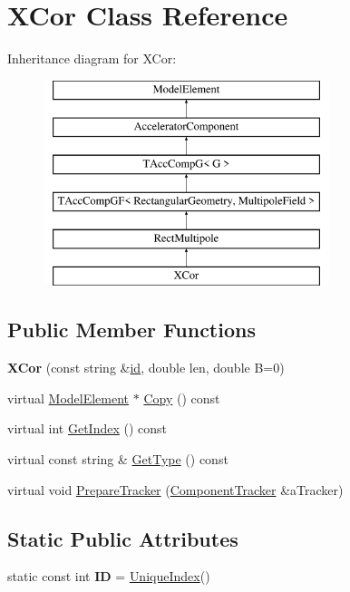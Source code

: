 \hypertarget{classXCor}{}\section{X\+Cor Class Reference}
\label{classXCor}
Inheritance diagram for X\+Cor\+:\begin{figure}[H]
\begin{center}
\leavevmode
\includegraphics[height=6.000000cm]{classXCor}
\end{center}
\end{figure}
\subsection*{Public Member Functions}
\begin{DoxyCompactItemize}
\item 
\mbox{\label{classXCor_a78a89fe33ceb8435e2810973e8e9acc3}} 
{\bfseries X\+Cor} (const string \&\hyperlink{classModelElement_aada171ead2085c75b592cf07d91bc5c2}{id}, double len, double B=0)
\item 
virtual \hyperlink{classModelElement}{Model\+Element} $\ast$ \hyperlink{classXCor_a8c84be893f565bd2dac6cf24da38873f}{Copy} () const
\item 
virtual int \hyperlink{classXCor_abc1f1ab53804904384d6fadfcbaba5bb}{Get\+Index} () const
\item 
virtual const string \& \hyperlink{classXCor_a7b8f33e0c46765aaf030ddc24dcdd91b}{Get\+Type} () const
\item 
virtual void \hyperlink{classXCor_abd5e017ea4191ee86f141d72979f90d2}{Prepare\+Tracker} (\hyperlink{classComponentTracker}{Component\+Tracker} \&a\+Tracker)
\end{DoxyCompactItemize}
\subsection*{Static Public Attributes}
\begin{DoxyCompactItemize}
\item 
\mbox{\label{classXCor_a824cc8ebe120c49e78e6ae02c8c6789a}} 
static const int {\bfseries ID} = \hyperlink{classAcceleratorComponent_aa7ad4d39e1a488b705983842ed1ac784}{Unique\+Index}()
\end{DoxyCompactItemize}
